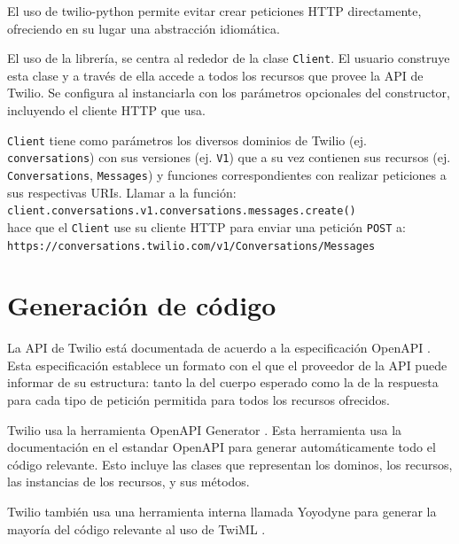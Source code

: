 \documentclass{article}
\begin{document}
El uso de twilio-python permite evitar crear peticiones HTTP directamente,
ofreciendo en su lugar una abstracción idiomática.

\hfill

El uso de la librería, se centra al rededor de la clase \verb|Client|.
El usuario construye esta clase
y a través de ella accede a todos los recursos que provee la API de Twilio.
Se configura al instanciarla con los parámetros opcionales del constructor,
incluyendo el cliente HTTP que usa.

\verb|Client| tiene como parámetros los diversos dominios de Twilio
(ej. \verb|conversations|)
con sus versiones (ej. \verb|V1|)
que a su vez contienen sus recursos
(ej. \verb|Conversations|, \verb|Messages|)
y funciones correspondientes con realizar peticiones
a sus respectivas URIs.
Llamar a la función:
\\ \hspace*{1em} \verb|client.conversations.v1.conversations.messages.create()|
\\hace que el \verb|Client|
use su cliente HTTP para enviar una petición \verb|POST| a:
\\ \hspace*{1em} \verb|https://conversations.twilio.com/v1/Conversations/Messages|

\hfill

\section{Generación de código}

La API de Twilio está documentada
de acuerdo a la especificación OpenAPI
\cite{twilio-openapi}
\cite{twilio-openapi-repo}.
Esta especificación establece un formato
con el que el proveedor de la API
puede informar de su estructura:
tanto la del cuerpo esperado
como la de la respuesta
para cada tipo de petición permitida
para todos los recursos ofrecidos.

Twilio usa la herramienta OpenAPI Generator
\cite{twilio-generated-openapi}.
Esta herramienta usa la documentación en el estandar OpenAPI
para generar automáticamente todo el código relevante.
Esto incluye las clases que representan los dominos,
los recursos, las instancias de los recursos,
y sus métodos.

\hfill

Twilio también usa una herramienta interna llamada Yoyodyne
para generar la mayoría del código relevante al uso de TwiML
\cite{twilio-generated-yoyodyne}.
\end{document}
